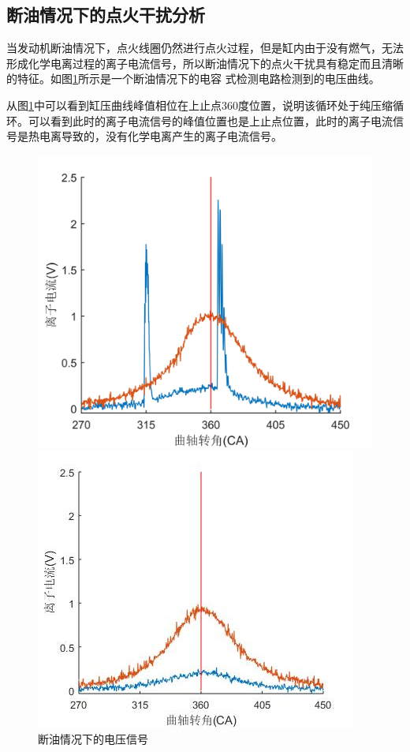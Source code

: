\subsection{断油情况下的点火干扰分析}
当发动机断油情况下，点火线圈仍然进行点火过程，但是缸内由于没有燃气，无法形成化学电离过程的离子电流信号，所以断油情况下的点火干扰具有稳定而且清晰的特征。如图\ref{fig:dy_ion}所示是一个断油情况下的电容
式检测电路检测到的电压曲线。
\par 从图\ref{fig:dy_ion}中可以看到缸压曲线峰值相位在上止点360度位置，说明该循环处于纯压缩循环。可以看到此时的离子电流信号的峰值位置也是上止点位置，此时的离子电流信号是热电离导致的，没有化学电离产生的离子电流信号。
\begin{figure}[H]
\begin{minipage}[t]{0.5\linewidth}
	\centering
	\includegraphics[width=\textwidth]{thesis_figure/ion_chapter/dy_ion}
	\caption{断油情况下的电压信号}
	\label{fig:dy_ion}
\end{minipage}
\begin{minipage}[t]{0.5\linewidth}
	\centering
	\includegraphics[width=\textwidth]{thesis_figure/ion_chapter/dh_ion}

\end{minipage}
\end{figure}
